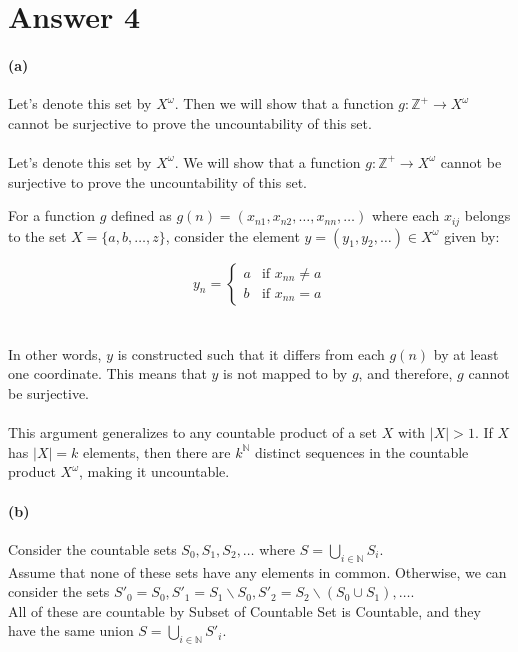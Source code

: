 \documentclass[12pt]{article}
\begin{document}
\section*{Answer 4}
\paragraph{(a)}
Let's denote this set by \(X^{\omega}\). Then we will show that a function \(g : \mathbb{Z}^+ \rightarrow X^{\omega}\) cannot be surjective
to prove the uncountability of this set.
\\ \\
Let's denote this set by \(X^\omega\). We will show that a function \(g:\mathbb{Z}^+ \rightarrow X^\omega\) cannot be surjective to prove the uncountability of this set.

For a function \(g\) defined as \(g(n) = (x_{n1}, x_{n2}, \ldots, x_{nn}, \ldots)\) where each \(x_{ij}\) belongs to the set \(X = \{a, b, \ldots, z\}\), consider the element \(y = (y_1, y_2, \ldots) \in X^\omega\) given by:

\[
y_n = 
\begin{cases}
    a & \text{if } x_{nn} \neq a \\
    b & \text{if } x_{nn} = a
\end{cases}
\]
\\ \\
In other words, \(y\) is constructed such that it differs from each \(g(n)\) by at least one coordinate. This means that \(y\) is not mapped to by \(g\), and therefore, \(g\) cannot be surjective.
\\ \\
This argument generalizes to any countable product of a set \(X\) with \(\lvert X \rvert > 1\). If \(X\) has \(\lvert X \rvert = k\) elements, then there are \(k^{\mathbb{N}}\) distinct sequences in the countable product \(X^\omega\), making it uncountable.



\paragraph{(b)}
Consider the countable sets \( S_0, S_1, S_2, \ldots \) where \( S = \bigcup_{i \in \mathbb{N}} S_i \). \\

Assume that none of these sets have any elements in common. Otherwise, we can consider the sets \( S'_0 = S_0, S'_1 = S_1 \backslash S_0, S'_2 = S_2 \backslash (S_0 \cup S_1), \ldots \). \\
All of these are countable by Subset of Countable Set is Countable, and they have the same union \( S = \bigcup_{i \in \mathbb{N}} S'_i \).\\
\end{document}
